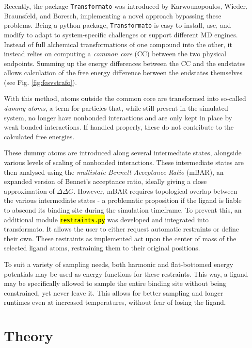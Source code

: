 \documentclass[oneside]{scrreprt}
\newcommand{\code}[1]{\texttt{\hl{#1}}}
\begin{document}
Recently, the package \texttt{Transformato} was introduced by Karwounopoulos, Wieder, Braunsfeld, and Boresch\cite{Karwou2022Jun,braunsfeldImplementationTestingCHARMM,Wieder2022Jun}, implementing a novel approach bypassing these problems. Being a python package, \texttt{Transformato} is easy to install, use, and modify to adapt to system-specific challenges or support different MD engines. Instead of full alchemical transformations of one compound into the other, it instead relies on computing a \emph{common core} (CC) between the two physical endpoints. Summing up the energy differences between the CC and the endstates allows calculation of the free energy difference between the endstates themselves (see Fig. \ref{fig:fesvstrafo}).



With this method, atoms outside the common core are transformed into so-called \emph{dummy atoms}, a term for particles that, while still present in the simulated system, no longer have nonbonded interactions and are only kept in place by weak bonded interactions. If handled properly, these do not contribute to the calculated free energies\cite{fleckDummyAtomsAlchemical2021}.

These dummy atoms are introduced along several intermediate states, alongside various levels of scaling of nonbonded interactions. These intermediate states are then analysed using the \emph{multistate Bennett Acceptance Ratio}\cite{Shirts2008Sep} (mBAR), an expanded version of Bennet's acceptance ratio\cite{Bennett1976Oct}, ideally giving a close approximation of $\Delta\Delta G$. However, mBAR requires topological overlap between the various intermediate states - a problematic proposition if the ligand is liable to abscond its binding site during the simulation timeframe. To prevent this, an additional module \code{restraints.py} was developed and integrated into transformato. It allows the user to either request automatic restraints or define their own. These restraints as implemented act upon the center of mass of the selected ligand atoms, restraining them to their original positions.

To suit a variety of sampling needs, both harmonic and flat-bottomed energy potentials may be used as energy functions for these restraints. This way, a ligand may be specifically allowed to sample the entire binding site without being constrained, yet never leave it. This allows for better sampling and longer runtimes even at increased temperatures, without fear of losing the ligand.
\chapter{Theory}
\end{document}
